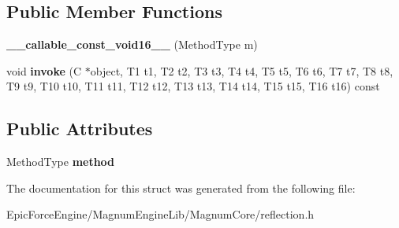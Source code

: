 \subsection*{Public Member Functions}
\begin{DoxyCompactItemize}
\item 
{\bfseries \+\_\+\+\_\+callable\+\_\+const\+\_\+void16\+\_\+\+\_\+} (Method\+Type m)\hypertarget{structagm_1_1reflection_1_1____callable__const__void16_____a58b487c0de5ad8e68a7991a41a26f73b}{}\label{structagm_1_1reflection_1_1____callable__const__void16_____a58b487c0de5ad8e68a7991a41a26f73b}

\item 
void {\bfseries invoke} (C $\ast$object, T1 t1, T2 t2, T3 t3, T4 t4, T5 t5, T6 t6, T7 t7, T8 t8, T9 t9, T10 t10, T11 t11, T12 t12, T13 t13, T14 t14, T15 t15, T16 t16) const \hypertarget{structagm_1_1reflection_1_1____callable__const__void16_____a6a34714aa3c77465f7b2284b9946d8f2}{}\label{structagm_1_1reflection_1_1____callable__const__void16_____a6a34714aa3c77465f7b2284b9946d8f2}

\end{DoxyCompactItemize}
\subsection*{Public Attributes}
\begin{DoxyCompactItemize}
\item 
Method\+Type {\bfseries method}\hypertarget{structagm_1_1reflection_1_1____callable__const__void16_____a1d49bfd8f7193fb71149245e3f9aadd9}{}\label{structagm_1_1reflection_1_1____callable__const__void16_____a1d49bfd8f7193fb71149245e3f9aadd9}

\end{DoxyCompactItemize}


The documentation for this struct was generated from the following file\+:\begin{DoxyCompactItemize}
\item 
Epic\+Force\+Engine/\+Magnum\+Engine\+Lib/\+Magnum\+Core/reflection.\+h\end{DoxyCompactItemize}
